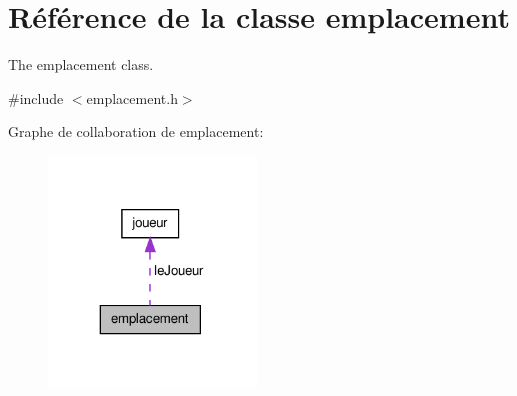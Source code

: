\hypertarget{classemplacement}{\section{Référence de la classe emplacement}
\label{classemplacement}
}


The emplacement class.  




{\ttfamily \#include $<$emplacement.\-h$>$}



Graphe de collaboration de emplacement\-:\nopagebreak
\begin{figure}[H]
\begin{center}
\leavevmode
\includegraphics[width=157pt]{classemplacement__coll__graph}
\end{center}
\end{figure}

